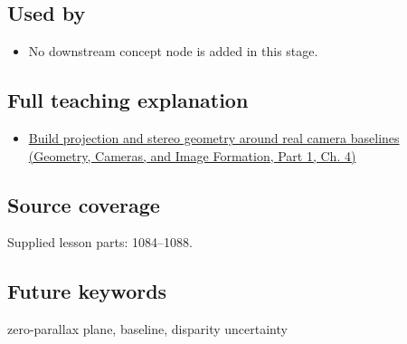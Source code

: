 \subsection{Used by}\label{appendix-0976e86e5b9f-used-by}

\hypertarget{appendix-0976e86e5b9f-used-by}{}

\begin{itemize}
\tightlist
\item
  No downstream concept node is added in this stage.
\end{itemize}

\subsection{Full teaching explanation}\label{appendix-0976e86e5b9f-full-teaching-explanation}

\hypertarget{appendix-0976e86e5b9f-full-teaching-explanation}{}

\begin{itemize}
\tightlist
\item
  \href{../03-Geometry-Cameras-and-Image-Formation-P01/main.pdf\#nameddest=02-foundations-ii-ch035-build-projection-and-stereo-geometry-around-real-camera-baselines}{Build projection and stereo geometry around real camera baselines (Geometry, Cameras, and Image Formation, Part 1, Ch. 4)}
\end{itemize}

\subsection{Source coverage}\label{appendix-0976e86e5b9f-source-coverage}

\hypertarget{appendix-0976e86e5b9f-source-coverage}{}

Supplied lesson parts: 1084--1088.

\subsection{Future keywords}\label{appendix-0976e86e5b9f-future-keywords}

\hypertarget{appendix-0976e86e5b9f-future-keywords}{}

zero-parallax plane, baseline, disparity uncertainty
